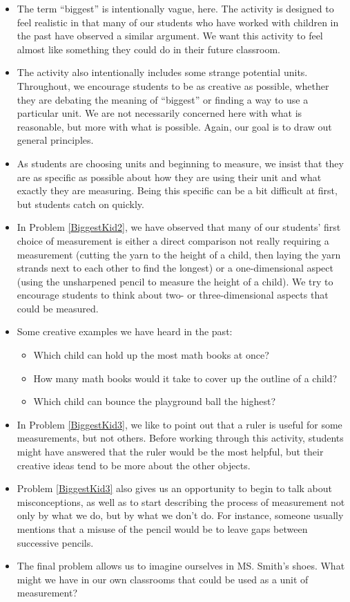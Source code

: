 \documentclass[nooutcomes]{ximera}
\begin{document}
\begin{instructorNotes}
\begin{itemize}
    \item The term ``biggest'' is intentionally vague, here.  The activity is designed to feel realistic in that many of our students who have worked with children in the past have observed a similar argument.  We want this activity to feel almost like something they could do in their future classroom.
    \item The activity also intentionally includes some strange potential units.  Throughout, we encourage students to be as creative as possible, whether they are debating the meaning of ``biggest'' or finding a way to use a particular unit.  We are not necessarily concerned here with what is reasonable, but more with what is possible.  Again, our goal is to draw out general principles.
    \item As students are choosing units and beginning to measure, we insist that they are as specific as possible about how they are using their unit and what exactly they are measuring.  Being this specific can be a bit difficult at first, but students catch on quickly.
    \item In Problem \ref{BiggestKid2}, we have observed that many of our students' first choice of measurement is either a direct comparison not really requiring a measurement (cutting the yarn to the height of a child, then laying the yarn strands next to each other to find the longest) or a one-dimensional aspect (using the unsharpened pencil to measure the height of a child).  We try to encourage students to think about two- or three-dimensional aspects that could be measured.
    \item Some creative examples we have heard in the past:
        \begin{itemize}
            \item Which child can hold up the most math books at once?
            \item How many math books would it take to cover up the outline of a child?
            \item Which child can bounce the playground ball the highest?
        \end{itemize}
    \item In Problem \ref{BiggestKid3}, we like to point out that a ruler is useful for some measurements, but not others.  Before working through this activity, students might have answered that the ruler would be the most helpful, but their creative ideas tend to be more about the other objects.
    \item Problem \ref{BiggestKid3} also gives us an opportunity to begin to talk about misconceptions, as well as to start describing the process of measurement not only by what we do, but by what we don't do.  For instance, someone usually mentions that a misuse of the pencil would be to leave gaps between successive pencils.
    \item The final problem allows us to imagine ourselves in MS. Smith's shoes.  What might we have in our own classrooms that could be used as a unit of measurement?
\end{itemize}
    


\end{instructorNotes}
\end{document}
